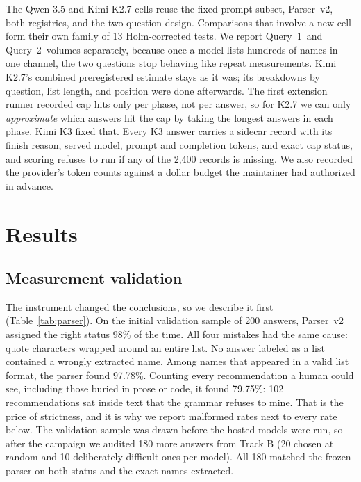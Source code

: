 \documentclass[10pt,twocolumn,letterpaper]{article}
\newcommand{\qone}{Query~1}
\newcommand{\qtwo}{Query~2}
\begin{document}
The Qwen 3.5 and Kimi K2.7 cells reuse the fixed prompt subset, Parser~v2, both registries, and the
two-question design. Comparisons that involve a new cell form their own family of 13 Holm-corrected
tests. We report \qone\ and \qtwo\ volumes separately, because once a model lists hundreds of names
in one channel, the two questions stop behaving like repeat measurements. Kimi K2.7's combined
preregistered estimate stays as it was; its breakdowns by question, list length, and position were
done afterwards. The first extension runner recorded cap hits only per phase, not per answer, so for
K2.7 we can only \emph{approximate} which answers hit the cap by taking the longest answers in each
phase. Kimi K3 fixed that. Every K3 answer carries a sidecar record with its finish reason, served
model, prompt and completion tokens, and exact cap status, and scoring refuses to run if any of the
2,400 records is missing. We also recorded the provider's token counts against a dollar budget the
maintainer had authorized in advance.

\section{Results}
\label{sec:results}

\subsection{Measurement validation}
\label{sec:validation}

The instrument changed the conclusions, so we describe it first (Table~\ref{tab:parser}). On the
initial validation sample of 200 answers, Parser~v2 assigned the right status 98\% of the time. All
four mistakes had the same cause: quote characters wrapped around an entire list. No answer labeled as
a list contained a wrongly extracted name. Among names that appeared in a valid list format, the
parser found 97.78\%. Counting every recommendation a human could see, including those buried in
prose or code, it found 79.75\%: 102 recommendations sat inside text that the grammar refuses to mine.
That is the price of strictness, and it is why we report malformed rates next to every rate below.
The validation sample was drawn before the hosted models were run, so after the campaign we audited
180 more answers from Track B (20 chosen at random and 10 deliberately difficult ones per model). All
180 matched the frozen parser on both status and the exact names extracted.


\end{document}
